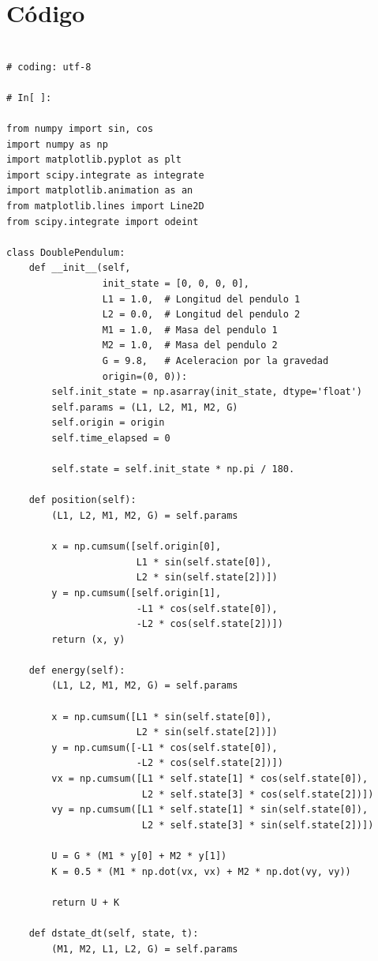 \documentclass[12pt]{article}
\begin{document}
\section{Código}
\begin{verbatim}

# coding: utf-8

# In[ ]:

from numpy import sin, cos
import numpy as np
import matplotlib.pyplot as plt
import scipy.integrate as integrate
import matplotlib.animation as an
from matplotlib.lines import Line2D
from scipy.integrate import odeint

class DoublePendulum:
    def __init__(self,
                 init_state = [0, 0, 0, 0],
                 L1 = 1.0,  # Longitud del pendulo 1
                 L2 = 0.0,  # Longitud del pendulo 2
                 M1 = 1.0,  # Masa del pendulo 1
                 M2 = 1.0,  # Masa del pendulo 2
                 G = 9.8,   # Aceleracion por la gravedad
                 origin=(0, 0)): 
        self.init_state = np.asarray(init_state, dtype='float')
        self.params = (L1, L2, M1, M2, G)
        self.origin = origin
        self.time_elapsed = 0

        self.state = self.init_state * np.pi / 180.
    
    def position(self):
        (L1, L2, M1, M2, G) = self.params

        x = np.cumsum([self.origin[0],
                       L1 * sin(self.state[0]),
                       L2 * sin(self.state[2])])
        y = np.cumsum([self.origin[1],
                       -L1 * cos(self.state[0]),
                       -L2 * cos(self.state[2])])
        return (x, y)

    def energy(self):
        (L1, L2, M1, M2, G) = self.params

        x = np.cumsum([L1 * sin(self.state[0]),
                       L2 * sin(self.state[2])])
        y = np.cumsum([-L1 * cos(self.state[0]),
                       -L2 * cos(self.state[2])])
        vx = np.cumsum([L1 * self.state[1] * cos(self.state[0]),
                        L2 * self.state[3] * cos(self.state[2])])
        vy = np.cumsum([L1 * self.state[1] * sin(self.state[0]),
                        L2 * self.state[3] * sin(self.state[2])])

        U = G * (M1 * y[0] + M2 * y[1])
        K = 0.5 * (M1 * np.dot(vx, vx) + M2 * np.dot(vy, vy))

        return U + K

    def dstate_dt(self, state, t):
        (M1, M2, L1, L2, G) = self.params


\end{verbatim}
\end{document}

